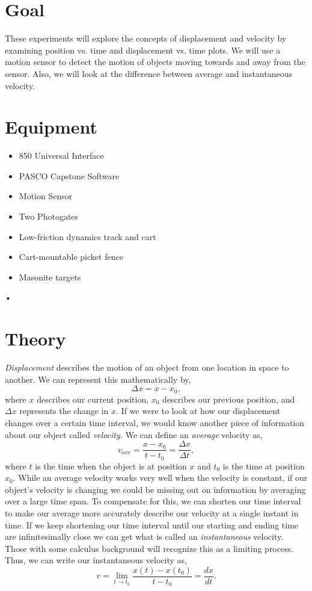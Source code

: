 \documentclass[main.tex]{subfiles}
\begin{document}
\section*{Goal}
These experiments will explore the concepts of displacement and velocity by examining position vs. time and displacement vs. time plots. We will use a motion sensor to detect the motion of objects moving towards and away from the sensor. Also, we will look at the difference between average and instantaneous velocity.

\section*{Equipment}
\begin{itemize}
\item
850 Universal Interface
\item
PASCO Capstone Software
\item
Motion Sensor
\item
Two Photogates
\item
Low-friction dynamics track and cart
\item
Cart-mountable picket fence
\item
Masonite targets
\end{itemize}•

\section*{Theory}
\emph{Displacement} describes the motion of an object from one location in space to another. We can represent this mathematically by,
\[
\Delta x = x-x_0,
\]
where $x$ describes our current position, $x_0$ describes our previous position, and $\Delta x$ represents the change in $x.$ If we were to look at how our displacement changes over a certain time interval, we would know another piece of information about our object called \emph{velocity.} We can define an \emph{average} velocity as,
\[
v_{ave} = \frac{x-x_0}{t-t_0}=\frac{\Delta x}{\Delta t},
\]
where $t$ is the time when the object is at position $x$ and $t_0$ is the time at position $x_0.$ While an average velocity works very well when the velocity is constant, if our object's velocity is changing we could be missing out on information by averaging over a large time span.  To compensate for this, we can shorten our time interval to make our average more accurately describe our velocity at a single instant in time. If we keep shortening our time interval until our starting and ending time are infinitesimally close we can get what is called an \emph{instantaneous} velocity. Those with some calculus background will recognize this as a limiting process. Thus, we can write our instantaneous velocity as,
\[
v=\lim_{t\rightarrow t_0}\frac{x(t)-x(t_0)}{t-t_0}=\frac{dx}{dt}.
\]
\end{document}
